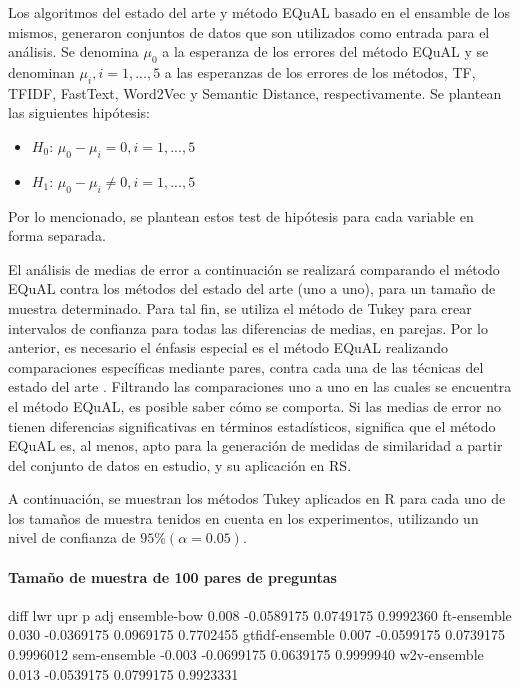 \bigskip Los algoritmos del estado del arte y método EQuAL basado en el ensamble de los mismos, generaron conjuntos de datos que son utilizados como entrada para el análisis. Se denomina \(\mu_0\) a la esperanza de los errores del método EQuAL y se denominan  \(\mu_i, i = 1,..., 5\) a las esperanzas de los errores de los métodos, TF, TFIDF, FastText, Word2Vec y Semantic Distance, respectivamente. Se plantean las siguientes hipótesis:
\begin{itemize}
	\item \textbf{\(H_0\)}: \(\mu_0 - \mu_i = 0, i = 1,..., 5\)
	\item \textbf{\(H_1\)}: \(\mu_0 - \mu_i \neq  0, i = 1,..., 5\)
\end{itemize}
Por lo mencionado, se plantean estos test de hipótesis para cada variable en forma separada.

\bigskip El análisis de medias de error a continuación se realizará comparando el método EQuAL contra los métodos del estado del arte (uno a uno), para un tamaño de muestra determinado. Para tal fin, se utiliza el método de Tukey para crear intervalos de confianza para todas las diferencias de medias, en parejas. Por lo anterior, es necesario el énfasis especial es el método EQuAL realizando comparaciones específicas mediante pares, contra cada una de las técnicas del estado del arte \citep{abdi2010tukey}. Filtrando las comparaciones uno a uno en las cuales se encuentra el método EQuAL, es posible saber cómo se comporta. Si las medias de error no tienen diferencias significativas en términos estadísticos, significa que el método EQuAL es, al menos, apto para la generación de medidas de similaridad a partir del conjunto de datos en estudio, y su aplicación en RS.

\bigskip A continuación, se muestran los métodos Tukey aplicados en R para cada uno de los tamaños de muestra tenidos en cuenta en los experimentos, utilizando un nivel de confianza de \(95\% (\alpha=0.05)\).

\paragraph{Tamaño de muestra de 100 pares de preguntas}
\begin{rc}
                 diff        lwr       upr     p adj
ensemble-bow     0.008 -0.0589175 0.0749175 0.9992360
ft-ensemble      0.030 -0.0369175 0.0969175 0.7702455
gtfidf-ensemble  0.007 -0.0599175 0.0739175 0.9996012
sem-ensemble    -0.003 -0.0699175 0.0639175 0.9999940
w2v-ensemble     0.013 -0.0539175 0.0799175 0.9923331
\end{rc}

